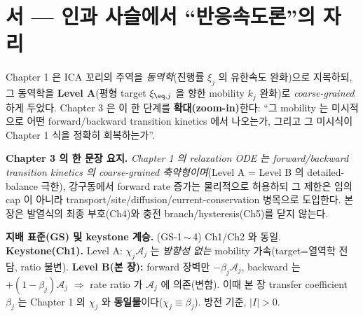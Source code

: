 
\section*{서 — 인과 사슬에서 ``반응속도론''의 자리}
Chapter 1 은 ICA 꼬리의 주역을 \emph{동역학}(진행률 $\xi_j$ 의 유한속도 완화)으로 지목하되, 그 동역학을
\textbf{Level A}(평형 target $\xi_{\eq,j}$ 을 향한 mobility $k_j$ 완화)로 \emph{coarse-grained} 하게 두었다.
Chapter 3 은 이 한 단계를 \textbf{확대(zoom-in)}한다: ``그 mobility 는 미시적으로 어떤 forward/backward
transition kinetics 에서 나오는가, 그리고 그 미시식이 Chapter 1 식을 정확히 회복하는가''.

\textbf{Chapter 3 의 한 문장 요지.} \emph{Chapter 1 의 relaxation ODE 는 forward/backward transition
kinetics 의 coarse-grained 축약형이며}(Level A = Level B 의 detailed-balance 극한), 강구동에서 forward rate
증가는 물리적으로 허용하되 그 제한은 임의 cap 이 아니라 transport/site/diffusion/current-conservation 병목으로
도입한다. 본 장은 발열식의 최종 부호(Ch4)와 충전 branch/hysteresis(Ch5)를 닫지 않는다.

\begin{groundingbox}
\textbf{지배 표준(GS) 및 keystone 계승.} (GS-1\,$\sim$\,4) Ch1/Ch2 와 동일. \textbf{Keystone(Ch1).} Level A:
$\chi_j\mathcal A_j$ 는 \emph{방향성 없는} mobility 가속(target=열역학 전담, ratio 불변). \textbf{Level B(본 장):}
forward 장벽만 $-\beta_j\mathcal A_j$, backward 는 $+(1-\beta_j)\mathcal A_j$ $\Rightarrow$ rate ratio 가
$\mathcal A_j$ 에 의존(변함). 이때 본 장 transfer coefficient $\beta_j$ 는 Chapter 1 의 $\chi_j$ 와
\textbf{동일물}이다($\chi_j\equiv\beta_j$). 방전 기준, $|I|>0$.
\end{groundingbox}


